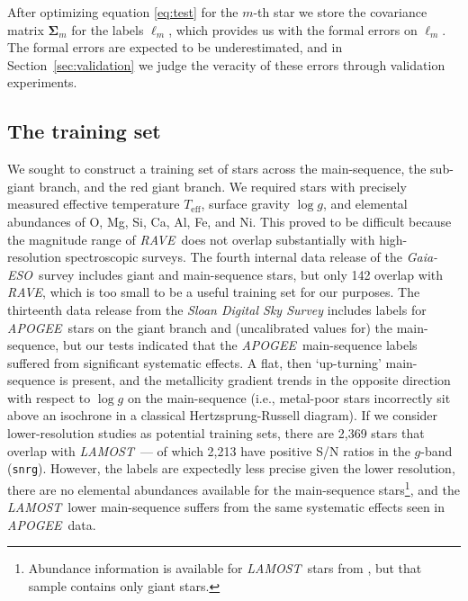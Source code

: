 \documentclass[preprint,trackchanges]{aastex}
\newcommand{\acronym}[1]{{\small{#1}}}
\newcommand{\project}[1]{\textsl{#1}}
\newcommand{\rave}{\project{\acronym{RAVE}}}
\newcommand{\ges}{\project{Gaia-ESO}}
\newcommand{\apogee}{\project{\acronym{APOGEE}}}
\newcommand{\lamost}{\project{\acronym{LAMOST}}}
\newcommand{\teff}{T_{\mathrm{eff}}}
\newcommand{\logg}{\log g}
\begin{document}
After optimizing equation \ref{eq:test} for the $m$-th star we store the covariance matrix 
$\bm{\Sigma}_m$ for the labels $\ell_m$, which provides us with the formal errors on $\ell_m$. 
The formal errors are expected to be underestimated, and in Section~\ref{sec:validation} 
we judge the veracity of these errors through validation experiments.



\subsection{The training set}
\label{sec:the-training-set}


We sought to construct a training set of stars across the main-sequence, the
sub-giant branch, and the red giant branch.  We required stars with precisely measured
effective temperature $\teff$, surface gravity $\logg$, and elemental abundances
of O, Mg, Si, Ca, Al, Fe, and Ni.  This proved to be difficult because the magnitude
range of \rave\ does not overlap substantially with high-resolution spectroscopic
surveys.  The fourth internal data release of the \ges\ survey includes 
giant and main-sequence stars, but only 142 overlap with \rave, which is too small to
be a useful training set for our purposes.  The thirteenth data release from the 
\project{Sloan Digital Sky Survey} \citep{sloan_dr13} includes labels for \apogee\ stars on the
giant branch and (uncalibrated values for) the main-sequence, but our tests indicated
that the \apogee\ main-sequence labels suffered from significant systematic effects.  
A flat, then `up-turning' main-sequence is present, and the metallicity gradient trends in 
the opposite direction with respect to $\logg$ on the main-sequence (i.e., metal-poor
stars incorrectly sit above an isochrone in a classical Hertzsprung-Russell diagram).
If we consider lower-resolution studies as potential training sets, there are 2,369
stars that overlap with \lamost\ --- of which 2,213 have positive S/N ratios in the 
$g$-band (\texttt{snrg}).  However, the labels are expectedly less precise given the
lower resolution, there are no elemental abundances available for the main-sequence 
stars\footnote{Abundance information is available for \lamost\ stars from \citet{Ho_2016},
but that sample contains only giant stars.}, and the \lamost\ lower main-sequence suffers
from the same systematic effects seen in \apogee\ data. 
\end{document}
